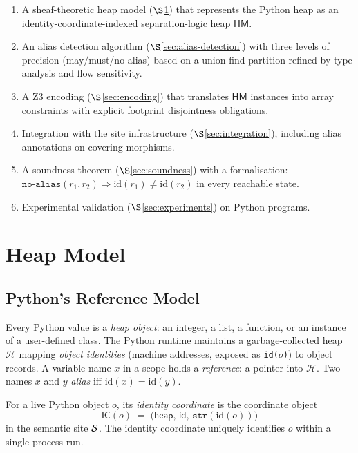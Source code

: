 \documentclass[11pt]{article}
\newcommand{\Heap}{\mathcal{H}}             %
\newcommand{\NoAlias}{\ensuremath{\mathtt{no\text{-}alias}}}     %
\newcommand{\HM}{\mathsf{HM}}               %
\newcommand{\IdentCoord}{\mathsf{IC}}       %
\begin{document}
\begin{enumerate}[noitemsep]
  \item A sheaf-theoretic heap model ($\S$\ref{sec:heap-model}) that
    represents the Python heap as an identity-coordinate-indexed
    separation-logic heap $\HM$.
  \item An alias detection algorithm ($\S$\ref{sec:alias-detection})
    with three levels of precision (may/must/no-alias) based on a
    union-find partition refined by type analysis and flow sensitivity.
  \item A Z3 encoding ($\S$\ref{sec:encoding}) that translates $\HM$
    instances into array constraints with explicit footprint
    disjointness obligations.
  \item Integration with the \JuGeo{} site infrastructure
    ($\S$\ref{sec:integration}), including alias annotations on
    covering morphisms.
  \item A soundness theorem ($\S$\ref{sec:soundness}) with a
    \LEAN{} formalisation: $\NoAlias(r_1,r_2) \Rightarrow
    \mathrm{id}(r_1)\neq\mathrm{id}(r_2)$ in every reachable state.
  \item Experimental validation ($\S$\ref{sec:experiments}) on
    \numcases{} Python programs.
\end{enumerate}

\section{Heap Model}
\label{sec:heap-model}

\subsection{Python's Reference Model}

Every Python value is a \emph{heap object}: an integer, a list, a
function, or an instance of a user-defined class.  The Python runtime
maintains a garbage-collected heap $\Heap$ mapping \emph{object
identities} (machine addresses, exposed as \texttt{id($o$)}) to object
records.  A variable name $x$ in a scope holds a \emph{reference}: a
pointer into $\Heap$.  Two names $x$ and $y$ \emph{alias} iff
$\mathrm{id}(x) = \mathrm{id}(y)$.

\begin{definition}
  \label{def:identity-coord}
  For a live Python object $o$, its \emph{identity coordinate} is the
  coordinate object
  \[
    \IdentCoord(o) \;=\; \bigl(\mathsf{heap},\, \mathsf{id},\,
      \texttt{str}(\mathrm{id}(o))\bigr)
  \]
  in the semantic site $\mathcal{S}$.  The identity coordinate uniquely
  identifies $o$ within a single process run.
\end{definition}
\end{document}
